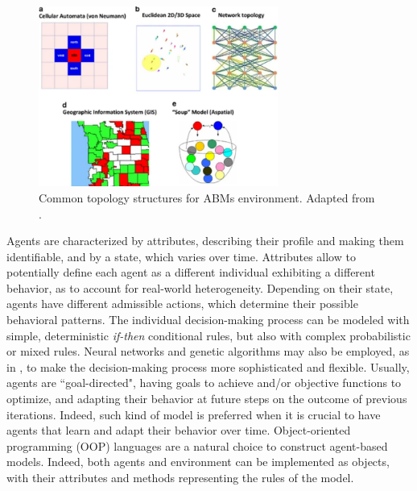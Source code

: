 \begin{figure}
    \centering
    \includegraphics[width=0.7\textwidth]{tex/pics/abm_topologies.png}
    \caption{Common topology structures for ABMs environment. Adapted from \textcite{tutorialABM1}.}
    \label{topologies}
\end{figure}

Agents are characterized by attributes, describing their profile and making them identifiable, and by a state, which varies over time. Attributes allow to potentially define each agent as a different individual exhibiting a different behavior, as to account for real-world heterogeneity. Depending on their state, agents have different admissible actions, which determine their possible behavioral patterns. The individual decision-making process can be modeled with simple, deterministic \textit{if-then} conditional rules, but also with complex probabilistic or mixed rules. Neural networks and genetic algorithms may also be employed, as in \textcite{ALKINANI20228325, abm_rl}, to make the decision-making process more sophisticated and flexible. Usually, agents are ``goal-directed", having goals to achieve and/or objective functions to optimize, and adapting their behavior at future steps on the outcome of previous iterations. Indeed, such kind of model is preferred when it is crucial to have agents that learn and adapt their behavior over time.
Object-oriented programming (OOP) languages are a natural choice to construct agent-based models. Indeed, both agents and environment can be implemented as objects, with their attributes and methods representing the rules of the model. 
  
